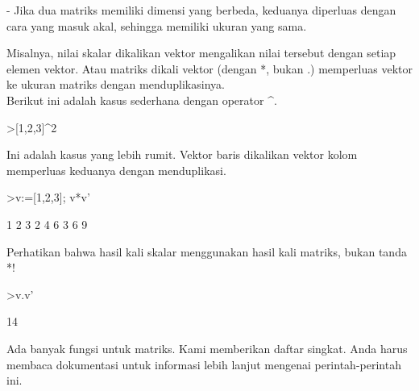 \documentclass[a4paper,10pt]{article}
\begin{document}
\begin{eulernotebook}
\begin{eulercomment}
\begin{eulercomment}
\begin{eulercomment}
\begin{eulercomment}
\begin{eulercomment}
- Jika dua matriks memiliki dimensi yang berbeda, keduanya diperluas
dengan cara yang masuk akal, sehingga memiliki ukuran yang sama.


Misalnya, nilai skalar dikalikan vektor mengalikan nilai tersebut
dengan setiap elemen vektor. Atau matriks dikali vektor (dengan *,
bukan .) memperluas vektor ke ukuran matriks dengan menduplikasinya.\\
Berikut ini adalah kasus sederhana dengan operator \textasciicircum{}.
\end{eulercomment}
\begin{eulerprompt}
>[1,2,3]^2
\end{eulerprompt}
\begin{euleroutput}
  [1,  4,  9]
\end{euleroutput}
\begin{eulercomment}
Ini adalah kasus yang lebih rumit. Vektor baris dikalikan vektor kolom
memperluas keduanya dengan menduplikasi.
\end{eulercomment}
\begin{eulerprompt}
>v:=[1,2,3]; v*v'
\end{eulerprompt}
\begin{euleroutput}
              1             2             3 
              2             4             6 
              3             6             9 
\end{euleroutput}
\begin{eulercomment}
Perhatikan bahwa hasil kali skalar menggunakan hasil kali matriks,
bukan tanda *!
\end{eulercomment}
\begin{eulerprompt}
>v.v'
\end{eulerprompt}
\begin{euleroutput}
  14
\end{euleroutput}
\begin{eulercomment}
Ada banyak fungsi untuk matriks. Kami memberikan daftar singkat. Anda
harus membaca dokumentasi untuk informasi lebih lanjut mengenai
perintah-perintah ini.\\
\end{eulercomment}
\begin{eulerttcomment}
  
\end{eulerttcomment}
\begin{eulercomment}


\end{eulercomment}
\end{eulercomment}
\end{eulercomment}
\end{eulercomment}
\end{eulercomment}
\end{eulernotebook}
\end{document}
